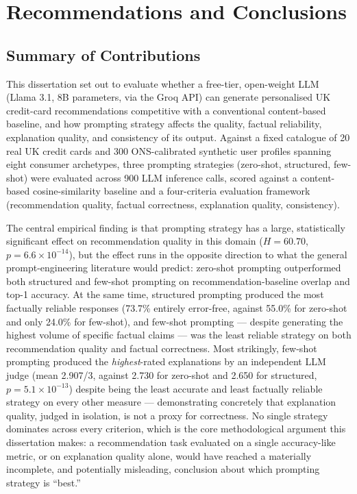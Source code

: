 \chapter{Recommendations and Conclusions}
\label{ch:conclusion}

\section{Summary of Contributions}

This dissertation set out to evaluate whether a free-tier, open-weight LLM (Llama 3.1, 8B parameters, via the Groq API) can generate personalised UK credit-card recommendations competitive with a conventional content-based baseline, and how prompting strategy affects the quality, factual reliability, explanation quality, and consistency of its output. Against a fixed catalogue of 20 real UK credit cards and 300 ONS-calibrated synthetic user profiles spanning eight consumer archetypes, three prompting strategies (zero-shot, structured, few-shot) were evaluated across 900 LLM inference calls, scored against a content-based cosine-similarity baseline and a four-criteria evaluation framework (recommendation quality, factual correctness, explanation quality, consistency).

The central empirical finding is that prompting strategy has a large, statistically significant effect on recommendation quality in this domain ($H = 60.70$, $p = 6.6\times10^{-14}$), but the effect runs in the opposite direction to what the general prompt-engineering literature would predict: zero-shot prompting outperformed both structured and few-shot prompting on recommendation-baseline overlap and top-1 accuracy. At the same time, structured prompting produced the most factually reliable responses (73.7\% entirely error-free, against 55.0\% for zero-shot and only 24.0\% for few-shot), and few-shot prompting --- despite generating the highest volume of specific factual claims --- was the least reliable strategy on both recommendation quality and factual correctness. Most strikingly, few-shot prompting produced the \textit{highest}-rated explanations by an independent LLM judge (mean 2.907/3, against 2.730 for zero-shot and 2.650 for structured, $p = 5.1\times10^{-13}$) despite being the least accurate and least factually reliable strategy on every other measure --- demonstrating concretely that explanation quality, judged in isolation, is not a proxy for correctness. No single strategy dominates across every criterion, which is the core methodological argument this dissertation makes: a recommendation task evaluated on a single accuracy-like metric, or on explanation quality alone, would have reached a materially incomplete, and potentially misleading, conclusion about which prompting strategy is ``best.''


